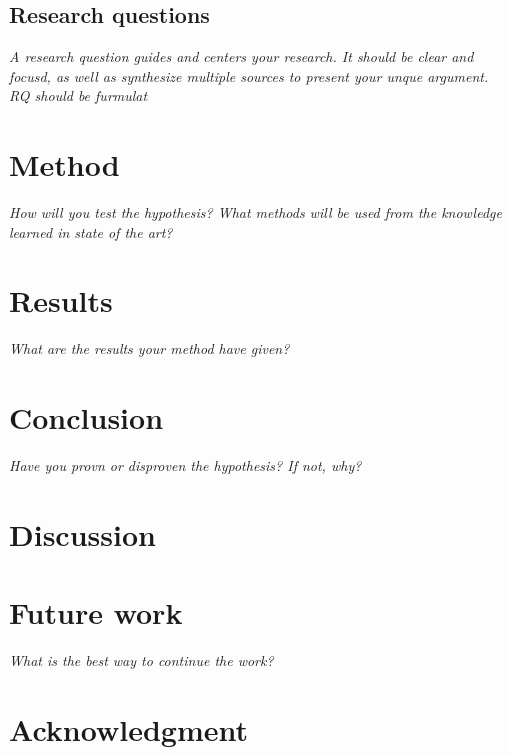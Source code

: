 \documentclass[conference]{IEEEtran}
\begin{document}
\subsection{Research questions}
\textit{A research question guides and centers your research. It should be clear and focusd, as well as synthesize multiple sources to present your unque argument. RQ should be furmulat}

\section{Method}
\textit{How will you test the hypothesis? What methods will be used from the knowledge learned in state of the art?}
\section{Results}
\textit{What are the results your method have given?}
\section{Conclusion}
\textit{Have you provn or disproven the hypothesis? If not, why?}
\section{Discussion}

\section{Future work}
\textit{What is the best way to continue the work?}


\section*{Acknowledgment}






\end{document}

